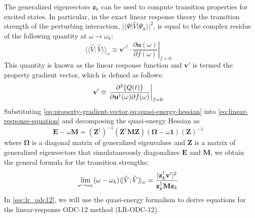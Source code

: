 The generalized eigenvectors \(\mathbf{z}_k\) can be used to
compute transition properties for excited states.
In particular, in the exact linear response theory\cite{Olsen:1985p3235} the transition strength
of the perturbing interaction,
\(
    |\langle\Psi|\hat{V}|\Psi_k\rangle|^2
\),
is equal to the complex residue of the following quantity at
\(\omega\rightarrow\omega_k\):
\begin{equation}
    \langle\!\langle \hat{V}; \hat{V} \rangle\!\rangle_\omega
    \equiv
    \left.
    \mathbf{v}'^\dagger
    \cdot
    \frac{\partial \mathbf{u}(\omega)}{\partial f(\omega)}
    \right|_{f=0}
\end{equation}
This quantity is known as the linear response function and
\(
    \mathbf{v}'
\)
is termed the property gradient vector,\cite{Sauer:2011} which is defined as
follows:
\begin{equation}
    \label{eq:property-gradient-vector}
    \mathbf{v}'
    \equiv
    \left.
    \frac{%
        \partial^2 \{Q(t)\}
    }{%
        \partial \mathbf{u}^\dagger(\omega)
        \partial f(\omega)
    }
    \right|_{f=0}
\end{equation}
Substituting \cref{eq:property-gradient-vector,eq:quasi-energy-hessian} into
\cref{eq:linear-response-equation} and decomposing the quasi-energy Hessian as
\begin{equation}
    \mathbf{E} - \omega\mathbf{M}
    =
    (\mathbf{Z}^\dagger)^{-1}
    (\mathbf{Z}^\dagger \mathbf{M} \mathbf{Z})
    (\boldsymbol\Omega - \omega\mathbf{1})
    (\mathbf{Z})^{-1}
\end{equation}
where \(\boldsymbol\Omega\) is a diagonal matrix of generalized eigenvalues and
\(\mathbf{Z}\) is a matrix of generalized eigenvectors that simulataneously
diagonalizes \(\mathbf{E}\) and \(\mathbf{M}\), we obtain the
general formula for the transition strengths:
\begin{equation}
    \lim_{\omega\rightarrow \omega_k}
    (\omega-\omega_k)
    \langle\!\langle \hat{V}; \hat{V} \rangle\!\rangle_\omega
    =
    \frac{%
        |\mathbf{z}_k^\dagger \mathbf{v}'|^2
    }{%
        \mathbf{z}_k^\dagger \mathbf{M}\mathbf{z}_k
    }
\end{equation}
In \cref{sec:lr_odc12}, we will use the quasi-energy formalism to derive
equations for the linear-response ODC-12 method (LR-ODC-12).


